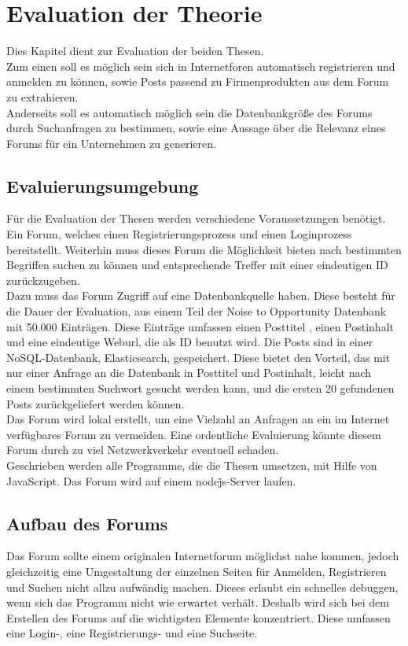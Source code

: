 \section{Evaluation der Theorie}
Dies Kapitel dient zur Evaluation der beiden Thesen.\\
Zum einen soll es möglich sein sich in Internetforen automatisch registrieren und anmelden zu können, sowie Posts passend zu Firmenprodukten aus dem Forum zu extrahieren.\\
Anderseits soll es automatisch möglich sein die Datenbankgröße des Forums durch Suchanfragen zu bestimmen, sowie eine Aussage über die Relevanz eines Forums für ein Unternehmen zu generieren.
\subsection{Evaluierungsumgebung}
Für die Evaluation der Thesen werden verschiedene Voraussetzungen benötigt. Ein Forum, welches einen Registrierungsprozess und einen Loginprozess bereitstellt. Weiterhin muss dieses Forum die Möglichkeit bieten nach bestimmten Begriffen suchen zu können und entsprechende Treffer mit einer eindeutigen ID zurückzugeben.\\
Dazu muss das Forum Zugriff auf eine Datenbankquelle haben. Diese besteht für die Dauer der Evaluation, aus einem Teil der Noise to Opportunity Datenbank mit 50.000 Einträgen. Diese Einträge umfassen einen Posttitel , einen Postinhalt und eine eindeutige Weburl, die als ID benutzt wird. Die Posts sind in einer NoSQL-Datenbank, Elasticsearch, gespeichert. Diese bietet den Vorteil, das mit nur einer Anfrage an die Datenbank in Posttitel und Postinhalt, leicht nach einem bestimmten Suchwort gesucht werden kann, und die ersten 20 gefundenen Posts zurückgeliefert werden können.\\
Das Forum wird lokal erstellt, um eine Vielzahl an Anfragen an ein im Internet verfügbares Forum zu vermeiden. Eine ordentliche Evaluierung könnte diesem Forum durch zu viel Netzwerkverkehr eventuell schaden.\\
Geschrieben werden alle Programme, die die Thesen umsetzen, mit Hilfe von JavaScript. Das Forum wird auf einem node\.js-Server laufen. 
\subsection{Aufbau des Forums}
Das Forum sollte einem originalen Internetforum möglichst nahe kommen, jedoch gleichzeitig eine Umgestaltung der einzelnen Seiten für Anmelden, Registrieren und Suchen nicht allzu aufwändig machen. Dieses erlaubt ein schnelles debuggen, wenn sich das Programm nicht wie erwartet verhält. Deshalb wird sich bei dem Erstellen des Forums auf die wichtigsten Elemente konzentriert. Diese umfassen eine Login-, eine Registrierungs- und eine Suchseite.
